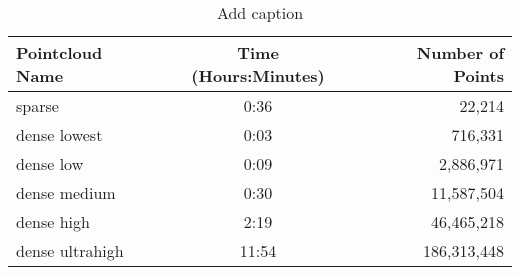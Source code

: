 \begin{table}[htbp]
  \centering
  \caption{Add caption}
    \begin{tabular}{lcr}
   	\toprule
    Pointcloud Name & Time (Hours:Minutes) & Number of Points \\
    \midrule
    sparse          & 0:36 & 22,214 \\
    dense lowest    & 0:03 & 716,331 \\
    dense low       & 0:09 & 2,886,971 \\
    dense medium    & 0:30 & 11,587,504 \\
    dense high      & 2:19 & 46,465,218 \\
    dense ultrahigh & 11:54 & 186,313,448 \\
    \bottomrule
    \end{tabular}%
  \label{tab:pctime}%
\end{table}%
